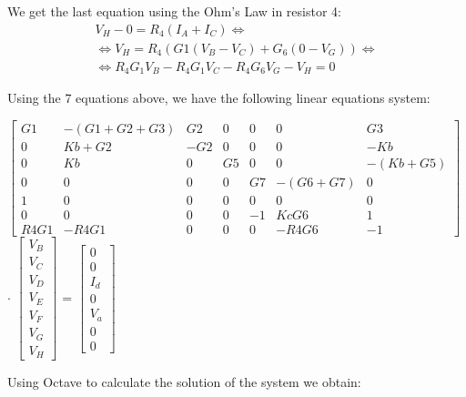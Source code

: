 We get the last equation using the Ohm's Law in resistor 4:
\begin{gather}
    V_H-0=R_4(I_A+I_C) \iff \nonumber \\
    \iff V_H=R_4(G1(V_B-V_C)+G_6(0-V_G)) \iff \\
    \iff R_4G_1V_B-R_4G_1V_C-R_4G_6V_G-V_H=0 \nonumber
\end{gather}

Using the 7 equations above, we have the following linear equations system:
\vspace{10pt}

\fontsize{8}{12}\selectfont
$\begin{bmatrix}
    G1 & -(G1+G2+G3) & G2 & 0 & 0 & 0 & G3 \\
    0 & Kb+G2 & -G2 & 0 & 0 & 0 & -Kb \\
    0 & Kb & 0 & G5 & 0 & 0 & -(Kb+G5) \\
    0 & 0 & 0 & 0 & G7 & -(G6+G7) & 0 \\
    1 & 0 & 0 & 0 & 0 & 0 & 0 \\
    0 & 0 & 0 & 0 & -1 & KcG6 & 1 \\
    R4G1 & -R4G1 & 0 & 0 & 0 & -R4G6 & -1
\end{bmatrix}$ $\cdot$
$\begin{bmatrix}
     V_B \\V_C \\V_D \\V_E \\V_F \\V_G \\V_H
\end{bmatrix}$ =
$\begin{bmatrix}
    0 \\0 \\I_d \\0 \\V_a \\0 \\0
\end{bmatrix}$

\fontsize{11}{12}\selectfont
\vspace{20pt}
Using Octave to calculate the solution of the system we obtain:

